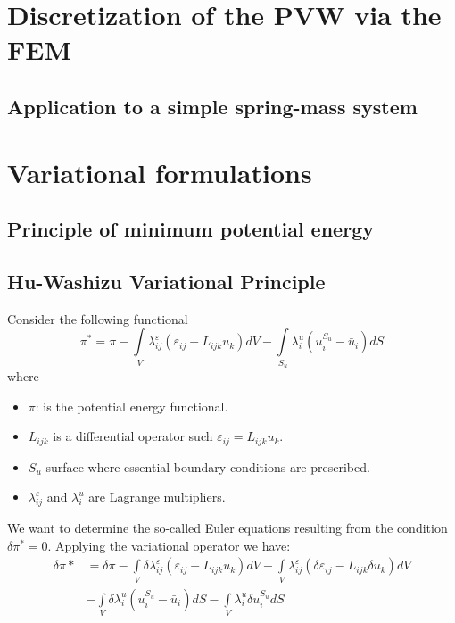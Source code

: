 \section[Discretization of the PVW using FEM]{Discretization of the PVW via the FEM}

\subsection*{Application to a simple spring-mass system}

\section{Variational formulations}

\subsection{Principle of minimum potential energy}

\subsection{Hu-Washizu Variational Principle}
Consider the following functional
\begin{equation}
{\pi ^*} = \pi  - \int\limits_V {\lambda _{ij}^\varepsilon ({\varepsilon _{ij}} - {L_{ijk}}{u_k})dV}  - \int\limits_{{S_u}} {\lambda _i^u(u_i^{{S_u}} - {{\bar u}_i})dS}
\label{eq:Hu}
\end{equation}
where
\begin{itemize}
\item $\pi$: is the potential energy functional.
\item $L_{ijk}$ is a differential operator such ${\varepsilon _{ij}} = {L_{ijk}}{u_k}$.
\item $S_u$ surface where essential boundary conditions are prescribed.
\item $\lambda _{ij}^\varepsilon $ and ${\lambda _i^u}$ are Lagrange multipliers.
\end{itemize}

We want to determine the so-called Euler equations resulting from the condition $\delta \pi^* = 0$. Applying the variational operator we have:
\begin{equation}
\begin{aligned}
\delta \pi *& = \delta \pi  - \int\limits_V {\delta \lambda _{ij}^\varepsilon } ({\varepsilon _{ij}} - {L_{ijk}}{u_k})dV- \int\limits_V {\lambda _{ij}^\varepsilon } (\delta {\varepsilon _{ij}} - {L_{ijk}}\delta {u_k})dV \\
&-\int\limits_V {\delta \lambda _i^u} (u_i^{{S_u}} - {\bar u_i})dS - \int\limits_V {\lambda _i^u} \delta u_i^{{S_u}}dS
\end{aligned}
\end{equation}

